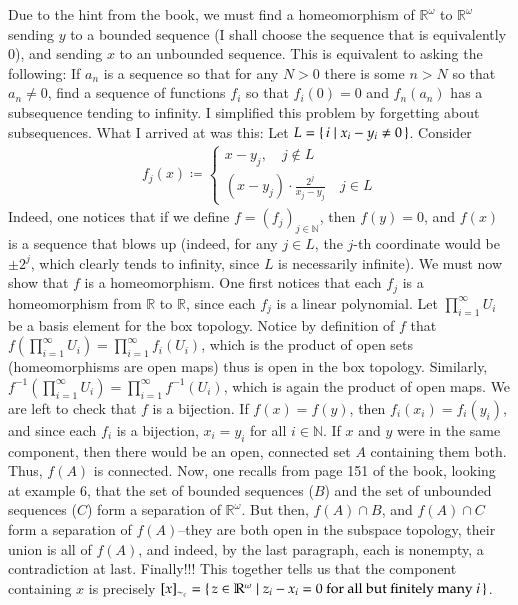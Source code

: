 \documentclass[12pt]{article}
\theoremstyle{definitionstyle}
\def\mbb#1{\mathbb{#1}}
\def\bN{\mbb{N}}
\def \R{\mbb{R}}
\begin{document}
\begin{enumerate}[leftmargin=\labelsep]
		Due to the hint from the book, we must find a homeomorphism of $\R^\omega$ to $\R^\omega$ sending $y$ to a bounded sequence (I shall choose the sequence that is equivalently 0), and sending $x$ to an unbounded sequence. This is equivalent to asking the following: If $a_n$ is a sequence so that for any $N > 0$ there is some $n > N$ so that $a_n \neq 0$, find a sequence of functions $f_i$ so that $f_i(0) = 0$ and $f_n(a_n)$ has a subsequence tending to infinity. I simplified this problem by forgetting about subsequences. What I arrived at was this: Let $L = \set{i | x_i-y_i \neq 0}$. Consider
		\begin{align*}
			f_j(x) \coloneqq \begin{cases}
				x-y_j, \quad j \not \in L \\
				(x-y_j) \cdot \frac{2^j}{x_j-y_j} \quad j \in L
			\end{cases}
		\end{align*}
		Indeed, one notices that if we define $f = (f_j)_{j \in \bN}$, then $f(y) = 0$, and $f(x)$ is a sequence that blows up (indeed, for any $j \in L$, the $j$-th coordinate would be $\pm 2^j$, which clearly tends to infinity, since $L$ is necessarily infinite). We must now show that $f$ is a homeomorphism. One first notices that each $f_j$ is a homeomorphism from $\R$ to $\R$, since each $f_j$ is a linear polynomial. Let $\prod_{i=1}^\infty U_i$ be a basis element for the box topology. Notice by definition of $f$ that $f(\prod_{i=1}^\infty U_i) = \prod_{i=1}^\infty f_i(U_i)$, which is the product of open sets (homeomorphisms are open maps) thus is open in the box topology. Similarly, $f^{-1}(\prod_{i=1}^\infty U_i) = \prod_{i=1}^\infty f^{-1}(U_i)$, which is again the product of open maps. We are left to check that $f$ is a bijection. If $f(x) = f(y)$, then $f_i(x_i) = f_i(y_i)$, and since each $f_i$ is a bijection, $x_i = y_i$ for all $i \in \bN$. If $x$ and $y$ were in the same component, then there would be an open, connected set $A$ containing them both. Thus, $f(A)$ is connected. Now, one recalls from page 151 of the book, looking at example 6, that the set of bounded sequences ($B$) and the set of unbounded sequences ($C$) form a separation of $\R^\omega$. But then, $f(A) \cap B$, and $f(A) \cap C$ form a separation of $f(A)$--they are both open in the subspace topology, their union is all of $f(A)$, and indeed, by the last paragraph, each is nonempty, a contradiction at last. Finally!!! This together tells us that the component containing $x$ is precisely $[x]_{\sim_c} = \set{z \in \R^\omega | z_i-x_i = 0 \text{ for all but finitely many $i$}}$.
		

\end{enumerate}
\end{document}
